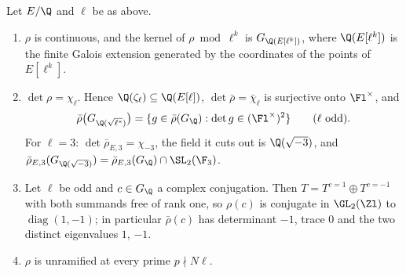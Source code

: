 \begin{proposition}\label{prop:galrep:rho-basic}
Let $E/\Q$ and $\ell$ be as above.
\begin{enumerate}[label=(\roman*)]
\item $\rho$ is continuous, and the kernel of $\rho\bmod\ell^k$ is $G_{\Q(E[\ell^k])}$, where $\Q(E[\ell^k])$ is the finite Galois extension generated
by the coordinates of the points of $E[\ell^k]$.
\item $\det\rho=\chi_\ell$. Hence $\Q(\zeta_\ell)\subseteq\Q(E[\ell])$, $\det\bar\rho=\bar\chi_\ell$ is surjective onto $\Fl^\times$, and
\[
\bar\rho\bigl(G_{\Q(\sqrt{\ell^*})}\bigr)=\{g\in\bar\rho(G_\Q):\det g\in(\Fl^\times)^2\}\qquad(\ell\text{ odd}).
\]
For $\ell=3$: $\det\bar\rho_{E,3}=\chi_{-3}$, the field it cuts out is $\Q(\sqrt{-3})$, and $\bar\rho_{E,3}(G_{\Q(\sqrt{-3})})=\bar\rho_{E,3}(G_\Q)\cap\SL_2(\F_3)$.
\item Let $\ell$ be odd and $c\in G_\Q$ a complex conjugation. Then $T=T^{c=1}\oplus T^{c=-1}$ with both summands free of rank one, so $\rho(c)$ is
conjugate in $\GL_2(\Zl)$ to $\operatorname{diag}(1,-1)$; in particular $\bar\rho(c)$ has determinant $-1$, trace $0$ and the two distinct
eigenvalues $1$, $-1$.
\item $\rho$ is unramified at every prime $p\nmid N\ell$.
\end{enumerate}
\end{proposition}

